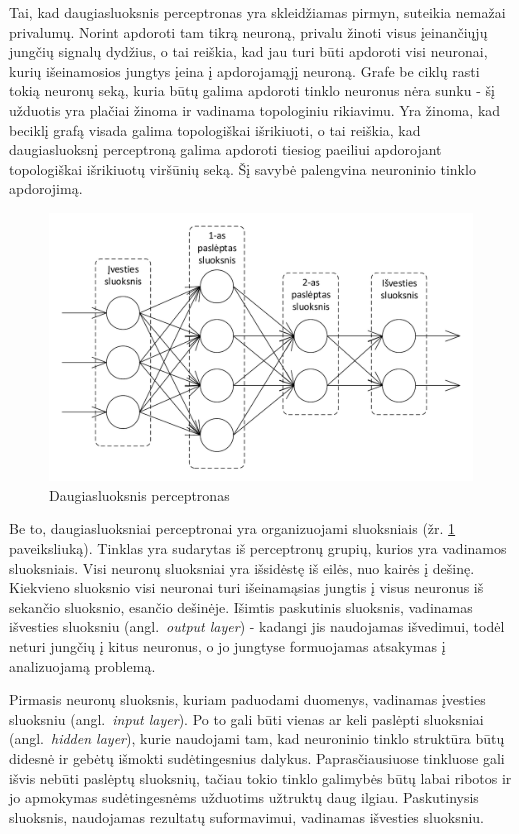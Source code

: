 \documentclass{VUMIFPSbakalaurinis}
\begin{document}
Tai, kad daugiasluoksnis perceptronas yra skleidžiamas pirmyn, suteikia nemažai privalumų.
Norint apdoroti tam tikrą neuroną, privalu žinoti visus įeinančiųjų jungčių signalų dydžius, o tai reiškia, kad jau turi būti apdoroti visi neuronai, kurių išeinamosios jungtys įeina į apdorojamąjį neuroną.
Grafe be ciklų rasti tokią neuronų seką, kuria būtų galima apdoroti tinklo neuronus nėra sunku - šį užduotis yra plačiai žinoma ir vadinama topologiniu rikiavimu.
Yra žinoma, kad beciklį grafą visada galima topologiškai išrikiuoti, o tai reiškia, kad daugiasluoksnį perceptroną galima apdoroti tiesiog paeiliui apdorojant topologiškai išrikiuotų viršūnių seką.
Šį savybė palengvina neuroninio tinklo apdorojimą.

\begin{figure}
	\includegraphics[scale=0.75]{diagrams/2_neural_network}
	\caption{Daugiasluoksnis perceptronas}
	\label{fig:neural_network}
\end{figure}

Be to, daugiasluoksniai perceptronai yra organizuojami sluoksniais (žr. \ref{fig:neural_network} paveiksliuką).
Tinklas yra sudarytas iš perceptronų grupių, kurios yra vadinamos sluoksniais.
Visi neuronų sluoksniai yra išsidėstę iš eilės, nuo kairės į dešinę.
Kiekvieno sluoksnio visi neuronai turi išeinamąsias jungtis į visus neuronus iš sekančio sluoksnio, esančio dešinėje.
Išimtis paskutinis sluoksnis, vadinamas išvesties sluoksniu (angl.~\textit{output layer}) - kadangi jis naudojamas išvedimui, todėl neturi jungčių į kitus neuronus, o jo jungtyse formuojamas atsakymas į analizuojamą problemą.

Pirmasis neuronų sluoksnis, kuriam paduodami duomenys, vadinamas įvesties sluoksniu (angl.~\textit{input layer}).
Po to gali būti vienas ar keli paslėpti sluoksniai (angl.~\textit{hidden layer}), kurie naudojami tam, kad neuroninio tinklo struktūra būtų didesnė ir gebėtų išmokti sudėtingesnius dalykus.
Paprasčiausiuose tinkluose gali išvis nebūti paslėptų sluoksnių, tačiau tokio tinklo galimybės būtų labai ribotos ir jo apmokymas sudėtingesnėms užduotims užtruktų daug ilgiau.
Paskutinysis sluoksnis, naudojamas rezultatų suformavimui, vadinamas išvesties sluoksniu.
\end{document}
